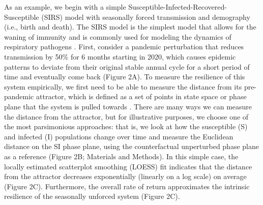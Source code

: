 \documentclass[12pt]{article}
\begin{document}
As an example, we begin with a simple Susceptible-Infected-Recovered-Susceptible (SIRS) model with seasonally forced transmission and demography (i.e., birth and death).
The SIRS model is the simplest model that allows for the waning of immunity and is commonly used for modeling the dynamics of respiratory pathogens \citep{dushoff2004dynamical}.
First, consider a pandemic perturbation that reduces transmission by 50\% for 6 months starting in 2020, which causes epidemic patterns to deviate from their original stable annual cycle for a short period of time and eventually come back (Figure 2A).
To measure the resilience of this system empirically, we first need to be able to measure the distance from its pre-pandemic attractor, which is defined as a set of points in state space or phase plane that the system is pulled towards \citep{hastings1993chaos}.
There are many ways we can measure the distance from the attractor, but for illustrative purposes, we choose one of the most parsimonious approaches: that is, we look at how the susceptible (S) and infected (I) populations change over time and measure the Euclidean distance on the SI phase plane, using the counterfactual unperturbed phase plane as a reference (Figure 2B; Materials and Methods).
In this simple case, the locally estimated scatterplot smoothing (LOESS) fit indicates that the distance from the attractor decreases exponentially (linearly on a log scale) on average (Figure 2C).
Furthermore, the overall rate of return approximates the intrinsic resilience of the seasonally unforced system (Figure 2C).
\end{document}
